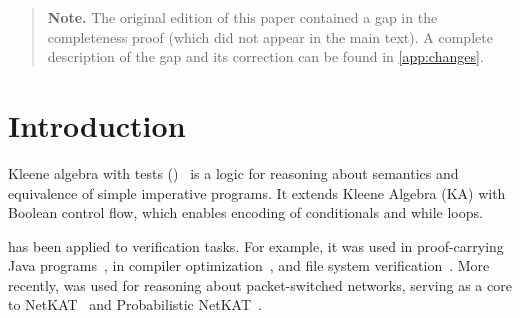 \documentclass[orivec,envcountsect,envcountsame]{llncs}
\begin{document}
\maketitle

\begin{abstract}
Guarded Kleene Algebra with Tests (GKAT) is a fragment of Kleene Algebra with Tests (KAT) that was recently introduced to reason efficiently about imperative programs. In contrast to KAT,  GKAT does not have an algebraic axiomatization, but relies on an analogue of Salomaa's axiomatization of Kleene Algebra. In this paper, we present an algebraic axiomatization and prove  two completeness results for a large fragment of GKAT consisting of \emph{skip-free programs}.
\end{abstract}

\begin{quote}
    {\bfseries \color{red} Note.} The original edition of this paper contained a gap in the completeness proof (which did not appear in the main text).  A complete description of the gap and its correction can be found in \cref{app:changes}.
\end{quote}

\section{Introduction}
%

    Kleene algebra with tests (\KAT)~\cite{katintro} is a logic for reasoning about semantics and equivalence of simple imperative programs.
    It extends Kleene Algebra (\textsf{KA}) with Boolean control flow, which enables encoding of conditionals and while loops.

    \KAT has been applied to verification tasks.
    For example, it was used in proof-carrying Java programs~\cite{DBLP:journals/entcs/KotK05}, in compiler optimization~\cite{DBLP:conf/cl/KozenP00}, and file system verification~\cite{DBLP:conf/pldi/ChajedTKZ19}.
    More recently, \KAT was used for reasoning about packet-switched networks, serving as a core to {\sffamily NetKAT}~\cite{netkat} and Probabilistic {\sffamily NetKAT}~\cite{probnetkat,cantorscott}.
\end{document}

